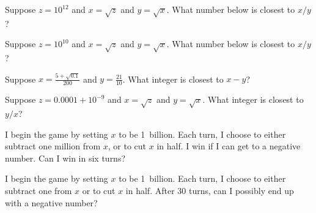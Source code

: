 \documentclass{ximera}
\begin{document}
\begin{shuffle}
\begin{problem}
  Suppose $z = 10^{12}$ and $x = \sqrt{z}$ and $y = \sqrt{x}$.  What number below is closest to $x/y$?
  \begin{multipleChoice}
  \end{multipleChoice}
\end{problem}

\begin{problem}
  Suppose $z = 10^{10}$ and $x = \sqrt{z}$ and $y = \sqrt{x}$.  What number below is closest to $x/y$?
  \begin{multipleChoice}
  \end{multipleChoice}
\end{problem}

\begin{problem}
  Suppose $x = \frac{5 + \sqrt{0.1}}{200}$ and $y = \frac{21}{10}$.  What integer is closest to $x - y$?
  \begin{multipleChoice}
  \end{multipleChoice}
\end{problem}

\begin{problem}
  Suppose $z = 0.0001 + 10^{-9}$ and $x = \sqrt{z}$ and $y = \sqrt{x}$.  What integer is closest to $y/x$?
  \begin{multipleChoice}
  \end{multipleChoice}
\end{problem}

\begin{problem}
  I begin the game by setting $x$ to be 1~billion.  Each turn, I
  choose to either subtract one million from $x$, or to cut $x$ in
  half.  I win if I can get to a negative number.  Can I win in six
  turns?
  \begin{multipleChoice}
  \end{multipleChoice}
\end{problem}

\begin{problem}
  I begin the game by setting $x$ to be 1~billion.  Each turn, I
  choose to either subtract one from $x$ or to cut $x$ in half.  After
  30 turns, can I possibly end up with a negative number?
  \begin{multipleChoice}
  \end{multipleChoice}
\end{problem}


\end{shuffle}
\end{document}
